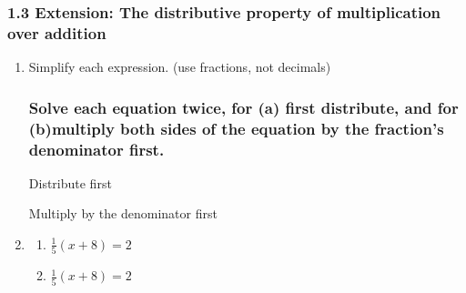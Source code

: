 

\fancyhead[LE]{\thepage}



\subsubsection*{1.3 Extension: The distributive property of multiplication over addition}
\begin{enumerate}
\item Simplify each expression. (use fractions, not decimals)
\begin{enumerate}[itemsep=2cm]
\end{enumerate} \vspace{1cm}

\subsubsection*{Solve each equation twice, for (a) first distribute, and for (b)multiply both sides of the equation by the fraction's denominator first.}
\begin{multicols}{2}
  Distribute first \par 
  Multiply by the denominator first
\end{multicols}
\item 
  \begin{multicols}{2}
    \begin{enumerate}
      \item $\frac{1}{5}(x+8)=2$
      \item $\frac{1}{5}(x+8)=2$
    \end{enumerate}
  \end{multicols} \vspace{3cm}


\end{enumerate}
